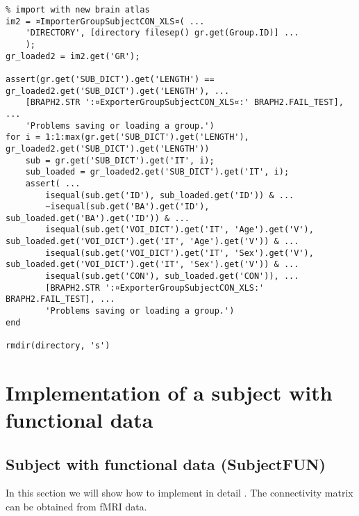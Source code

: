 \documentclass{tufte-handout}
\begin{document}
\begin{lstlisting}
% import with new brain atlas
im2 = ¤ImporterGroupSubjectCON_XLS¤( ...
    'DIRECTORY', [directory filesep() gr.get(Group.ID)] ...
    );
gr_loaded2 = im2.get('GR');

assert(gr.get('SUB_DICT').get('LENGTH') == gr_loaded2.get('SUB_DICT').get('LENGTH'), ...
	[BRAPH2.STR ':¤ExporterGroupSubjectCON_XLS¤:' BRAPH2.FAIL_TEST], ...
    'Problems saving or loading a group.')
for i = 1:1:max(gr.get('SUB_DICT').get('LENGTH'), gr_loaded2.get('SUB_DICT').get('LENGTH'))
    sub = gr.get('SUB_DICT').get('IT', i);
    sub_loaded = gr_loaded2.get('SUB_DICT').get('IT', i);    
    assert( ...
        isequal(sub.get('ID'), sub_loaded.get('ID')) & ...
        ~isequal(sub.get('BA').get('ID'), sub_loaded.get('BA').get('ID')) & ...
        isequal(sub.get('VOI_DICT').get('IT', 'Age').get('V'), sub_loaded.get('VOI_DICT').get('IT', 'Age').get('V')) & ... 
        isequal(sub.get('VOI_DICT').get('IT', 'Sex').get('V'), sub_loaded.get('VOI_DICT').get('IT', 'Sex').get('V')) & ...
        isequal(sub.get('CON'), sub_loaded.get('CON')), ...
        [BRAPH2.STR ':¤ExporterGroupSubjectCON_XLS:' BRAPH2.FAIL_TEST], ...
        'Problems saving or loading a group.')    
end

rmdir(directory, 's')
\end{lstlisting}
\clearpage
\section{Implementation of a subject with functional data}
\subsection{Subject with functional data (SubjectFUN)}

In this section we will show how to implement in detail . The connectivity matrix can be obtained from fMRI data.
\end{document}
